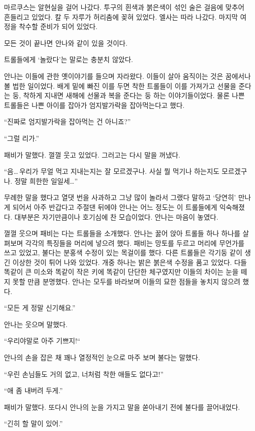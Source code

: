 마르쿠스는 알현실을 걸어 나갔다. 투구의 흰색과 붉은색이 섞인 술은 걸음에 맞추어 흔들리고 있었다. 칼 두 자루가 허리춤에 꽂혀 있었다. 엘사는 따라 나갔다. 마지막 여정을 착수할 준비가 되어 있었다.

모든 것이 끝나면 안나와 같이 있을 것이다.

\textbreak

트롤들에게 `놀랐다'는 말로는 충분치 않았다.

안나는 이들에 관한 옛이야기를 들으며 자라왔다. 이들이 살아 움직이는 것은 꿈에서나 볼 법한 일이었다. 배게 밑에 빠진 이를 두면 착한 트롤들이 이를 가져가고 선물을 준다는 둥, 착하게 지내면 새해에 선물과 복을 준다는 둥 하는 이야기들이었다. 물론 나쁜 트롤들은 나쁜 아이를 잡아가 엄지발가락을 잡아먹는다고 했다.

``진짜로 엄지발가락을 잡아먹는 건 아니죠?''

``그럴 리가.''

패비가 말했다. 껄껄 웃고 있었다. 그러고는 다시 말을 꺼냈다.

``음\ldots\,우리가 무얼 먹고 지내는지는 잘 모르겠구나. 사실 뭘 먹기나 하는지도 모르겠구나. 정말 희한한 일일세\ldots''

무례한 말을 했다고 열댓 번을 사과하고 그냥 많이 놀라서 그랬다 말하고 `당연히' 만나게 되어서 아주 반갑다고 주절댄 뒤에야 안나는 어느 정도는 이 트롤들에게 익숙해졌다. 대부분은 자기만큼이나 호기심에 찬 모습이었다. 안나는 마음이 놓였다.

껄껄 웃으며 패비는 다는 트롤들을 소개했다. 안나는 꿇어 앉아 트롤들 하나 하나를 살펴보며 각각의 특징들을 머리에 넣으려 했다. 패비는 망토를 두르고 머리에 무언가를 쓰고 있었고, 불다는 분홍색 수정이 있는 목걸이를 했다. 다른 트롤들은 각기둥 같이 생긴 이상한 것이 튀어 나와 있었다. 개중 하나는 밝은 붉은색 수정을 품고 있었다. 다들 똑같이 큰 미소와 똑같이 작은 키에 똑같이 단단한 체구였지만 이들의 차이는 눈을 떼지 못할 만큼 분명했다. 안나는 모두를 바라보며 이들의 묘한 점들을 놓치지 않으려 했다.

``모든 게 정말 신기해요.''

안나는 웃으며 말했다.

``우리야말로 아주 기쁘지!``

안나의 손을 잡은 채 꽤나 열정적인 눈으로 마주 보며 불다는 말했다.

``우린 손님들도 거의 없고, 너처럼 착한 애들도 없다고!''

``애 좀 내버려 두게.''

패비가 말했다. 또다시 안나의 눈을 가지고 말을 쏟아내기 전에 불다를 끌어내었다.

``긴히 할 말이 있어.''

